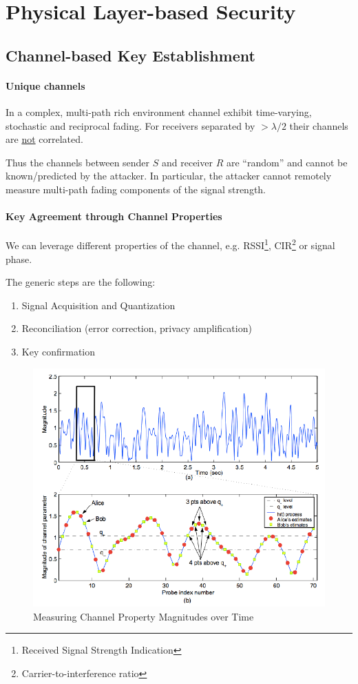 \section{Physical Layer-based Security}


\subsection{Channel-based Key Establishment}

\paragraph{Unique channels}
In a complex, multi-path rich environment channel exhibit time-varying, stochastic and reciprocal fading.
For receivers separated by $> \lambda / 2$ their channels are \underline{not} correlated.

Thus the channels between sender $S$ and receiver $R$ are ``random'' and cannot be known/predicted by the attacker.
In particular, the attacker cannot remotely measure multi-path fading components of the signal strength.

\paragraph{Key Agreement through Channel Properties}
We can leverage different properties of the channel, e.g. RSSI\footnote{Received Signal Strength Indication}, CIR\footnote{Carrier-to-interference ratio} or signal phase.

The generic steps are the following:
\begin{enumerate}
	\item Signal Acquisition and Quantization
	\item Reconciliation (error correction, privacy amplification)
	\item Key confirmation
\end{enumerate}

\begin{figure}[h]
	\centering
	\includegraphics[scale=0.5]{images/7-channel-property.png}
	\caption{Measuring Channel Property Magnitudes over Time}
	\label{fig:channel-property}
\end{figure}

